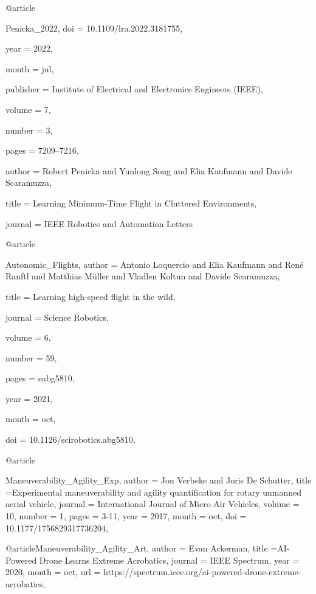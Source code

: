 @article{Penicka_2022,
	doi = {10.1109/lra.2022.3181755},
  
  
	year = 2022,
 
	month = jul,
  
	publisher = {Institute of Electrical and Electronics Engineers ({IEEE})},
  
	volume = {7},
  
	number = {3},
  
	pages = {7209--7216},
  
	author = {Robert Penicka and Yunlong Song and Elia Kaufmann and Davide Scaramuzza},
  
	title = {Learning Minimum-Time Flight in Cluttered Environments},
  
	journal = {{IEEE} Robotics and Automation Letters}
}


@article{Autonomic_Flights,
        author = {Antonio Loquercio  and Elia Kaufmann  and René Ranftl  and Matthias Müller  and Vladlen Koltun  and Davide Scaramuzza},
        
        title = {Learning high-speed flight in the wild},
        
        journal = {Science Robotics},
        
        volume = {6},
        
        number = {59},
        
        pages = {eabg5810},
        
        year = {2021},
        
        month = oct,
        
        doi = {10.1126/scirobotics.abg5810},
        
}


@article{Maneuverability_Agility_Exp,
        author = {Jon Verbeke and Joris De Schutter},
        title ={Experimental maneuverability and agility quantification for rotary unmanned aerial vehicle},
        journal = {International Journal of Micro Air Vehicles},
        volume = {10},
        number = {1},
        pages = {3-11},
        year = {2017},
        month = oct,
        doi = {10.1177/1756829317736204},
        
}

@article{Maneuverability_Agility_Art,
        author = {Evan Ackerman},
        title ={AI-Powered Drone Learns Extreme Acrobatics},
        journal = {{IEEE} Spectrum},
        year = {2020},
        month = oct,
        url = {https://spectrum.ieee.org/ai-powered-drone-extreme-acrobatics},
}

